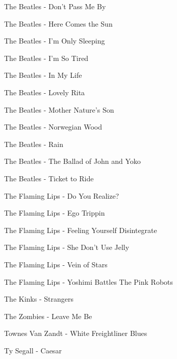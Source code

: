 The Beatles - Don't Pass Me By \dotfill \pageref{Don't Pass Me By - The Beatles} 

The Beatles - Here Comes the Sun \dotfill \pageref{Here Comes the Sun - The Beatles} 

The Beatles - I'm Only Sleeping \dotfill \pageref{I'm Only Sleeping - The Beatles} 

The Beatles - I'm So Tired \dotfill \pageref{I'm So Tired - The Beatles} 

The Beatles - In My Life \dotfill \pageref{In My Life - The Beatles} 

The Beatles - Lovely Rita \dotfill \pageref{Lovely Rita - The Beatles} 

The Beatles - Mother Nature's Son \dotfill \pageref{Mother Nature's Son - The Beatles} 

The Beatles - Norwegian Wood \dotfill \pageref{Norwegian Wood - The Beatles} 

The Beatles - Rain \dotfill \pageref{Rain - The Beatles} 

The Beatles - The Ballad of John and Yoko \dotfill \pageref{The Ballad of John and Yoko - The Beatles} 

The Beatles - Ticket to Ride \dotfill \pageref{Ticket to Ride - The Beatles} 

The Flaming Lips - Do You Realize? \dotfill \pageref{Do You Realize? - The Flaming Lips} 

The Flaming Lips - Ego Trippin \dotfill \pageref{Ego Trippin - The Flaming Lips} 

The Flaming Lips - Feeling Yourself Disintegrate \dotfill \pageref{Feeling Yourself Disintegrate - The Flaming Lips} 

The Flaming Lips - She Don't Use Jelly \dotfill \pageref{She Don't Use Jelly - The Flaming Lips} 

The Flaming Lips - Vein of Stars \dotfill \pageref{Vein of Stars - The Flaming Lips} 

The Flaming Lips - Yoshimi Battles The Pink Robots \dotfill \pageref{Yoshimi Battles The Pink Robots - The Flaming Lips} 

The Kinks - Strangers \dotfill \pageref{Strangers - The Kinks} 

The Zombies - Leave Me Be \dotfill \pageref{Leave Me Be - The Zombies} 

Townes Van Zandt - White Freightliner Blues \dotfill \pageref{White Freightliner Blues - Townes Van Zandt} 

Ty Segall - Caesar \dotfill \pageref{Caesar - Ty Segall} 

